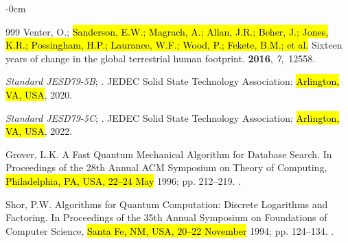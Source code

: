 \documentclass[mathematics,article,accept,pdftex,moreauthors]{Definitions/mdpi}
\begin{document}
\begin{adjustwidth}{-\extralength}{0cm}
\begin{thebibliography}{999}
Venter, O.; \hl{Sanderson, E.W.; Magrach, A.; Allan, J.R.; Beher, J.; Jones, K.R.; Possingham, H.P.; Laurance, W.F.; Wood, P.; Fekete, B.M.; et al. }%
\newblock Sixteen years of change in the global terrestrial human footprint.
 {\bf 2016}, {\em 7},~12558.

\emph{Standard JESD79-5B}; 
.
\newblock JEDEC Solid State Technology Association: \hl{Arlington, VA, USA},  2020.

\emph{Standard JESD79-5C}; 
.
\newblock JEDEC Solid State Technology Association: \hl{Arlington, VA, USA},  2022.

Grover, L.K.
\newblock A Fast Quantum Mechanical Algorithm for Database Search.
\newblock In Proceedings of the 28th Annual ACM Symposium on
  Theory of Computing, \hl{Philadelphia, PA, USA, 22--24 May} 1996; pp. 212--219.
.

Shor, P.W.
\newblock Algorithms for Quantum Computation: Discrete Logarithms and
  Factoring.
\newblock In Proceedings of the 35th Annual Symposium on
  Foundations of Computer Science, \hl{Santa Fe, NM, USA, 20--22 November} 1994; pp. 124--134.
.


\end{thebibliography}
\end{adjustwidth}
\end{document}
